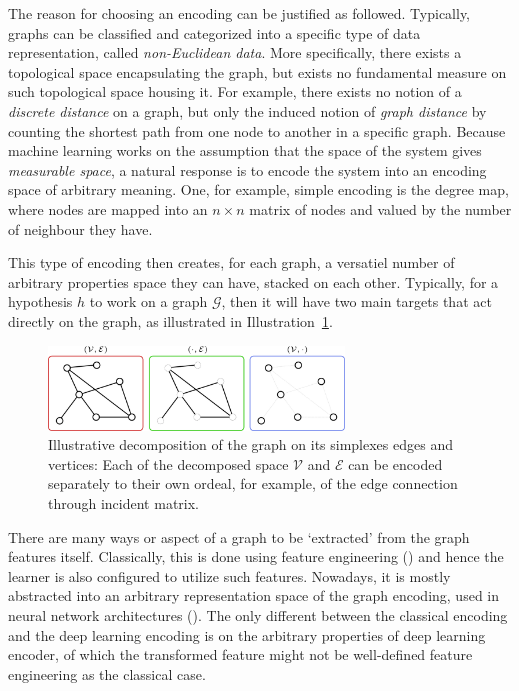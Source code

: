 \documentclass{article}
\begin{document}
The reason for choosing an encoding can be justified as followed. Typically, graphs can be classified and categorized into a specific type of data representation, called \textit{non-Euclidean data}. More specifically, there exists a topological space encapsulating the graph, but exists no fundamental measure on such topological space housing it. For example, there exists no notion of a \textit{discrete distance} on a graph, but only the induced notion of \textit{graph distance} by counting the shortest path from one node to another in a specific graph. Because machine learning works on the assumption that the space of the system gives \textit{measurable space}, a natural response is to encode the system into an encoding space of arbitrary meaning. One, for example, simple encoding is the degree map, where nodes are mapped into an $n\times n$ matrix of nodes and valued by the number of neighbour they have. 

This type of encoding then creates, for each graph, a versatiel number of arbitrary properties space they can have, stacked on each other. Typically, for a hypothesis $h$ to work on a graph $\mathcal{G}$, then it will have two main targets that act directly on the graph, as illustrated in Illustration~\ref{fig:graphdecom}.
\begin{figure}[htb]
    \centering
    \includegraphics[width=0.7\textwidth]{img/graphdecom.png}
    \caption{Illustrative decomposition of the graph on its simplexes edges and vertices: Each of the decomposed space $\mathcal{V}$ and $\mathcal{E}$ can be encoded separately to their own ordeal, for example, of the edge connection through incident matrix.}
    \label{fig:graphdecom}
\end{figure}
There are many ways or aspect of a graph to be `extracted' from the graph features itself. Classically, this is done using feature engineering (\cite{GRP_Hamilton}) and hence the learner is also configured to utilize such features. Nowadays, it is mostly abstracted into an arbitrary representation space of the graph encoding, used in neural network architectures (\cite{Oono2020Graph,lopushanskyy2024graphneuralnetworksgraph,Scar04,GRP_Hamilton}). The only different between the classical encoding and the deep learning encoding is on the arbitrary properties of deep learning encoder, of which the transformed feature might not be well-defined feature engineering as the classical case. 
\end{document}
